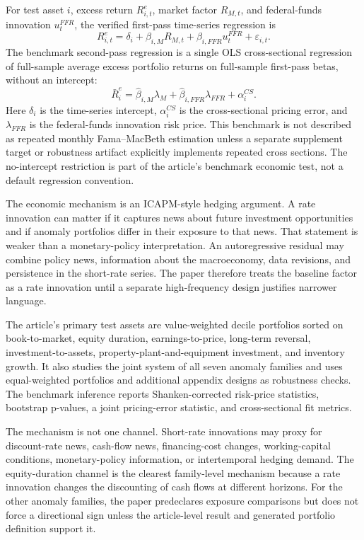 \documentclass[11pt]{article}
\begin{document}
For test asset \(i\), excess return \(R^e_{i,t}\), market factor \(R_{M,t}\), and
federal-funds innovation \(u^{FFR}_t\), the verified first-pass time-series
regression is
\[
R^e_{i,t}=\delta_i+\beta_{i,M}R_{M,t}+
\beta_{i,FFR}u^{FFR}_t+\varepsilon_{i,t}.
\]
The benchmark second-pass regression is a single OLS cross-sectional regression
of full-sample average excess portfolio returns on full-sample first-pass betas,
without an intercept:
\[
\bar R^e_i=\hat\beta_{i,M}\lambda_M+
\hat\beta_{i,FFR}\lambda_{FFR}+\alpha^{CS}_i.
\]
Here \(\delta_i\) is the time-series intercept, \(\alpha^{CS}_i\) is the
cross-sectional pricing error, and \(\lambda_{FFR}\) is the federal-funds
innovation risk price. This benchmark is not described as repeated monthly
Fama--MacBeth estimation unless a separate supplement target or robustness
artifact explicitly implements repeated cross sections. The no-intercept
restriction is part of the article's benchmark economic test, not a default
regression convention. %

The economic mechanism is an ICAPM-style hedging argument. A rate innovation can
matter if it captures news about future investment opportunities and if anomaly
portfolios differ in their exposure to that news. That statement is weaker than
a monetary-policy interpretation. An autoregressive residual may combine policy
news, information about the macroeconomy, data revisions, and persistence in the
short-rate series. The paper therefore treats the baseline factor as a rate
innovation until a separate high-frequency design justifies narrower language.

The article's primary test assets are value-weighted decile portfolios sorted on
book-to-market, equity duration, earnings-to-price, long-term reversal,
investment-to-assets, property-plant-and-equipment investment, and inventory
growth. %
It also studies the joint system of all seven anomaly families and uses
equal-weighted portfolios and additional appendix designs as robustness checks. %
The benchmark inference reports Shanken-corrected risk-price statistics,
bootstrap p-values, a joint pricing-error statistic, and cross-sectional fit
metrics. %

The mechanism is not one channel. Short-rate innovations may proxy for
discount-rate news, cash-flow news, financing-cost changes, working-capital
conditions, monetary-policy information, or intertemporal hedging demand. The
equity-duration channel is the clearest family-level mechanism because a rate
innovation changes the discounting of cash flows at different horizons. For the
other anomaly families, the paper predeclares exposure comparisons but does not
force a directional sign unless the article-level result and generated portfolio
definition support it. %
\end{document}
